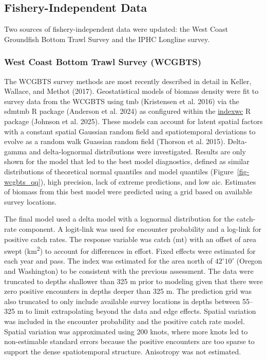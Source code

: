 \documentclass[
]{scrartcl}
\begin{document}
\subsection{Fishery-Independent Data}\label{fishery-independent-data}

Two sources of fishery-independent data were updated: the West Coast
Groundfish Bottom Trawl Survey and the IPHC Longline survey.

\subsubsection{West Coast Bottom Trawl Survey
(WCGBTS)}\label{west-coast-bottom-trawl-survey-wcgbts}

The WCGBTS survey methods are most recently described in detail in
Keller, Wallace, and Methot (2017). Geostatistical models of biomass
density were fit to survey data from the WCGBTS using \gls{tmb}
(Kristensen et al. 2016) via the \gls{sdmtmb} R package (Anderson et al.
2024) as configured within the
\href{https://github.com/pfmc-assessments/indexwc}{indexwc} R package
(Johnson et al. 2025). These models can account for latent spatial
factors with a constant spatial Gaussian random field and spatiotemporal
deviations to evolve as a random walk Guassian random field (Thorson et
al. 2015). Delta-gamma and delta-lognormal distributions were
investigated. Results are only shown for the model that led to the best
model diagnostics, defined as similar distributions of theoretical
normal quantiles and model quantiles (Figure~\ref{fig-wcgbts_qq}), high
precision, lack of extreme predictions, and low \gls{aic}. Estimates of
biomass from this best model were predicted using a grid based on
available survey locations.

The final model used a delta model with a lognormal distribution for the
catch-rate component. A logit-link was used for encounter probability
and a log-link for positive catch rates. The response variable was catch
(mt) with an offset of area swept (km\textsuperscript{2}) to account for
differences in effort. Fixed effects were estimated for each year and
pass. The index was estimated for the area north of \(42^{\circ}10'\)
(Oregon and Washington) to be consistent with the previous assessment.
The data were truncated to depths shallower than 325 m prior to modeling
given that there were zero positive encounters in depths deeper than 325
m. The prediction grid was also truncated to only include available
survey locations in depths between 55--325 m to limit extrapolating
beyond the data and edge effects. Spatial variation was included in the
encounter probability and the positive catch rate model. Spatial
variation was approximated using 200 knots, where more knots led to
non-estimable standard errors because the positive encounters are too
sparse to support the dense spatiotemporal structure. Anisotropy was not
estimated.
\end{document}

